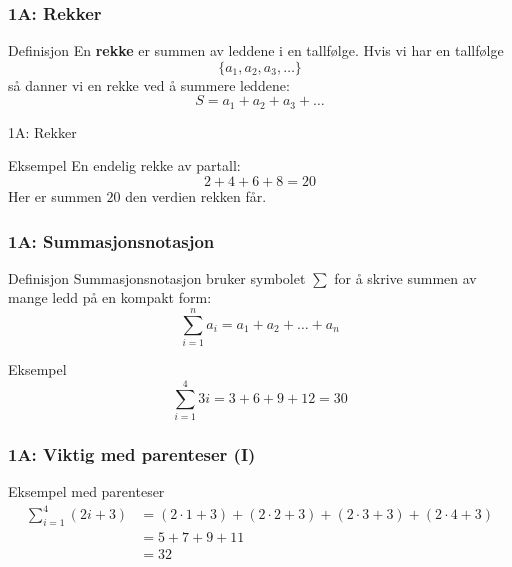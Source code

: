 \blueheader
\begin{frame}
\frametitle{1A: Rekker}
\begin{blue*}{Definisjon}
En \textbf{rekke} er summen av leddene i en tallfølge.  
Hvis vi har en tallfølge
\[
\{a_1, a_2, a_3, \ldots\}
\]
så danner vi en rekke ved å summere leddene:
\[
S = a_1 + a_2 + a_3 + \ldots
\]
\end{blue*}
\end{frame}

\begin{frame}{1A: Rekker}
\begin{green*}{Eksempel}
En endelig rekke av partall:
\begin{equation*}
2 + 4 + 6 + 8 = 20
\end{equation*}
Her er summen $20$ den verdien rekken får.
\end{green*}
\end{frame}


\blueheader
\begin{frame}
\frametitle{1A: Summasjonsnotasjon}
\begin{blue*}{Definisjon}
Summasjonsnotasjon bruker symbolet $\sum$ for å skrive summen av mange ledd på en kompakt form:
\begin{equation*}
\sum_{i=1}^{n} a_i = a_1 + a_2 + \ldots + a_n
\end{equation*}
\end{blue*}

\begin{green*}{Eksempel}
\begin{equation*}
\sum_{i=1}^{4} 3i = 3 + 6 + 9 + 12 = 30
\end{equation*}
\end{green*}

\end{frame}
\blueheader
\begin{frame}
\frametitle{1A: Viktig med parenteser (I)}

\begin{green*}{Eksempel med parenteser}
\begin{align*}
\sum_{i=1}^{4} (2i+3) 
&= (2\cdot1+3) + (2\cdot2+3) + (2\cdot3+3) + (2\cdot4+3) \\
&= 5 + 7 + 9 + 11 \\
&= 32
\end{align*}
\end{green*}

\end{frame}

